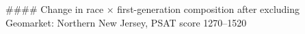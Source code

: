 #### Change in race × first-generation composition after excluding Geomarket: Northern New Jersey, PSAT score 1270–1520
